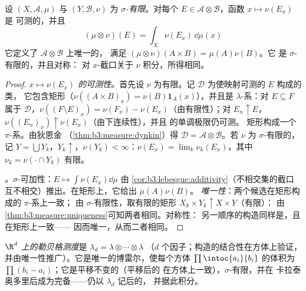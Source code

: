 \begin{theorem}[乘积测度]\label{thm:b3:product:existence}
设 $(X, \mathcal A, \mu)$ 与 $(Y, \mathcal B, \nu)$ 为
\emph{$\sigma$-有限}。对每个 $E \in \mathcal
A\otimes\mathcal B$，函数 $x \mapsto \nu(E_x)$ 是
可测的，并且
\[
(\mu\otimes\nu)(E) = \int_X \nu(E_x)\,\dd\mu(x)
\]
它定义了 $\mathcal A\otimes\mathcal B$ 上唯一的，
满足 $(\mu\otimes\nu)(A\times B) = \mu(A)\nu(B)$。它
是 $\sigma$-有限的，并且对称：
对 $x$-截口关于 $\nu$ 积分，所得相同。
\end{theorem}

\begin{proof}
\emph{$x \mapsto \nu(E_x)$ 的可测性。}首先设 $\nu$
为有限。记 $\mathcal D$ 为使映射可测的 $E$ 构成的类，
它包含矩形（$\nu((A\times B)_x) =
\nu(B)\mathbf 1_A(x)$），并且是 $\lambda$-系：对 $E
\subseteq F$ 属于 $\mathcal D$，$\nu((F\setminus E)_x) =
\nu(F_x) - \nu(E_x)$（由有限性）；对 $E_n \uparrow E$，
$\nu((E_n)_x) \uparrow \nu(E_x)$（由下连续性），并且
的单调极限仍可测。
矩形构成一个 $\pi$-系。由狄恩金
（\cref{thm:b3:measure:dynkin}）得 $\mathcal D = \mathcal
A\otimes\mathcal B$。若 $\nu$ 为 $\sigma$-有限的，记 $Y =
\bigcup Y_k$，$Y_k \uparrow$，$\nu(Y_k) < \infty$：$\nu(E_x) =
\lim_k\nu_k(E_x)$，其中 $\nu_k = \nu(\cdot\cap Y_k)$ 有限。

\emph{。}$\sigma$-可加性：$E \mapsto
\int\nu(E_x)\dd\mu$ 由
\cref{cor:b3:lebesgue:additivity}（不相交集的截口互不相交）推出。在矩形上，它给出
$\mu(A)\nu(B)$。
\emph{唯一性}：两个候选在矩形构成的 $\pi$-系上一致；
由 $\sigma$-有限性，取有限的矩形 $X_k\times
Y_k \uparrow X\times Y$（有限）：
由\cref{thm:b3:measure:uniqueness}可知两者相同。对称性：
另一顺序的构造同样是，且在矩形上一致——
因而唯一，从而二者相同。
\end{proof}

\begin{definition}\label{def:b3:product:lebesgue}
\emph{$\R^d$ 上的勒贝格测度}是 $\lambda_d = \lambda\otimes\cdots\otimes\lambda$
（$d$ 个因子；构造的结合性在方体上验证，
并由唯一性推广）。它是唯一的博雷尔，使每个方体
$\prod\intoc{a_i}{b_i}$ 的体积为
$\prod(b_i - a_i)$；它是平移不变的（平移后的
在方体上一致），$\sigma$-有限，并在
卡拉泰奥多里后成为完备——仍以 $\lambda_d$ 记后的，
并据此积分。
\end{definition}

